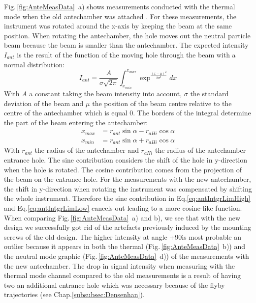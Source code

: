	Fig.\,\ref{fig:AnteMeasData}~a) shows measurements conducted with the thermal mode when the old antechamber was attached \cite{Meyer_2017_ante}. For these measurements, the instrument was rotated around the x-axis by keeping the beam at the same position. When rotating the antechamber, the hole moves out the neutral particle beam because the beam is smaller than the antechamber. The expected intensity $I_{ant}$ is the result of the function of the moving hole through the beam with a normal distribution:
	\begin{equation}
		I_{ant} = \frac{A}{\sigma\sqrt{2\pi}}\int_{x_{min}}^{x_{max}} \exp^{\frac{(x-\mu)^2}{2\sigma^2}} dx
	\end{equation}
	With $A$ a constant taking the beam intensity into account, $\sigma$ the standard deviation of the beam and $\mu$ the position of the beam centre relative to the centre of the antechamber which is equal 0. The borders of the integral determine the part of the beam entering the antechamber:
	\begin{align}
		x_{max} &= r_{ant}\sin{\alpha} - r_{aHi}\cos{\alpha}\label{eq:antIntgrLimHigh}\\
		x_{min} &= r_{ant}\sin{\alpha} + r_{aHi}\cos{\alpha}\label{eq:antIntgrLimLow}
	\end{align}
	With $r_{ant}$ the radius of the antechamber and $r_{aHi}$ the radius of the antechamber entrance hole. The sine contribution considers the shift of the hole in y-direction when the hole is rotated. The cosine contribution comes from the projection of the beam on the entrance hole. For the measurements with the new antechamber, the shift in y-direction when rotating the instrument was compensated by shifting the whole instrument. Therefore the sine contribution in Eq.\eqref{eq:antIntgrLimHigh} and Eq.\eqref{eq:antIntgrLimLow} cancels out leading to a more cosine-like function.\\
	When comparing Fig.\,\ref{fig:AnteMeasData}~a) and b), we see that with the new design we successfully got rid of the artefacts previously induced by the mounting screws of the old design. The higher intensity at angle +90\degree is most probable an outlier because it appears in both the thermal (Fig.\,\ref{fig:AnteMeasData}~b)) and the neutral mode graphic (Fig.\,\ref{fig:AnteMeasData}~d)) of the measurements with the new antechamber. The drop in signal intensity when measuring with the thermal mode channel compared to the old measurements is a result of having two an additional entrance hole which was necessary because of the flyby trajectories (see Chap.\ref{subsubsec:Densenhan}).\\	
